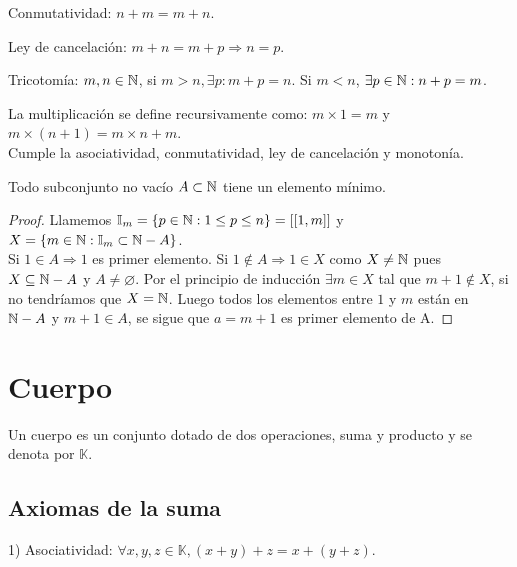 \begin{prop}
    Conmutatividad: \(n+m = m+n\).
\end{prop}

\begin{prop}
    Ley de cancelación: \(m+n = m+p \Rightarrow n=p\).
\end{prop}

\begin{prop}
    Tricotomía: \(m,n \in \mathbb{N}\), si \(m > n, \exists p:m+p=n\). Si \(m < n\),  \(\exists p \in \mathbb{N} :n+p=m\).
\end{prop}

\begin{definition}
    La multiplicación se define recursivamente como: \(m \times 1 =m\) y \(m \times (n+1) = m \times n + m\). \\
    Cumple la asociatividad, conmutatividad, ley de cancelación y monotonía.
\end{definition}

\begin{theorem}
    Todo subconjunto no vacío \(A \subset \mathbb{N}\) tiene un elemento mínimo.
    \begin{proof}
        Llamemos \(\mathbb{I}_m = \{ p \in \mathbb{N} : 1 \leq p \leq n \} = [[ 1, m ]]\) y \(X = \{ m \in \mathbb{N} : \mathbb{I}_m \subset \mathbb{N} - A \}\). \\
        Si \(1 \in A \Rightarrow 1\) es primer elemento.
        Si \(1 \notin A \Rightarrow 1 \in X\) como \(X \neq \mathbb{N}\) pues \(X \subseteq \mathbb{N} - A\) y \(A \neq \varnothing\).
        Por el principio de inducción \(\exists m \in X\) tal que \(m+1 \notin X\), si no tendríamos que \(X = \mathbb{N}\). Luego todos los elementos entre \(1\) y \(m\) están en \(\mathbb{N} - A\) y \(m+1 \in A\), se sigue que \(a = m+1\) es primer elemento de A.
    \end{proof}
\end{theorem}


\section{Cuerpo}

Un cuerpo es un conjunto dotado de dos operaciones, suma y producto y se denota por \(\mathbb{K}\).

\subsection{Axiomas de la suma}

1) Asociatividad: \(\forall x,y,z \in \mathbb{K}, (x+y)+z=x+(y+z)\).

